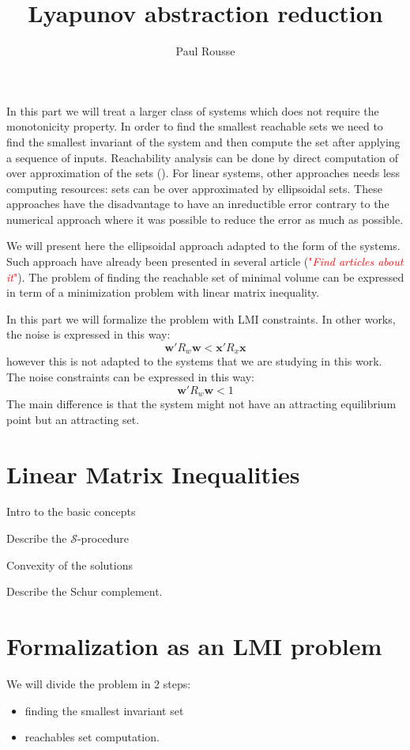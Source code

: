 \documentclass{article}
\theoremstyle{named}
\newcommand{\vect}[1]{\ensuremath{ \mathbf{#1}}}
\newcommand\comment[1]{\textcolor{red}{"\textit{#1}"}}
\newcommand{\Sproc}{$\mathcal{S}$-procedure}
\begin{document}
\title{Lyapunov abstraction reduction}
\author{Paul Rousse}

\maketitle

In this part we will treat a larger class of systems which does not require the monotonicity property.
In order to find the smallest reachable sets we need to find the smallest invariant of the system and then compute the set after applying a sequence of inputs.
Reachability analysis can be done by direct computation of over approximation of the sets (\cite{reissig2011computing}). For linear systems, other approaches needs less computing resources: sets can be over approximated by ellipsoidal sets. These approaches have the disadvantage to have an inreductible error contrary to the numerical approach where it was possible to reduce the error as much as possible.

We will present here the ellipsoidal approach adapted to the form of the systems.
Such approach have already been presented in several article (\comment{Find articles about it}).
The problem of finding the reachable set of minimal volume can be expressed in term of a minimization problem with linear matrix inequality.

In this part we will formalize the problem with LMI constraints.
In other works, the noise is expressed in this way:
$$
\vect{w}' R_w \vect{w} < \vect{x}' R_x \vect{x}
$$
however this is not adapted to the systems that we are studying in this work.
The noise constraints can be expressed in this way:
$$
\vect{w}' R_w \vect{w} < 1
$$
The main difference is that the system might not have an attracting equilibrium point but an attracting set.

\section{Linear Matrix Inequalities}
Intro to the basic concepts

Describe the \Sproc{} 

Convexity of the solutions

Describe the Schur complement.

\section{Formalization as an LMI problem}
We will divide the problem in 2 steps:
\begin{itemize}
\item finding the smallest invariant set
\item reachables set computation.
\end{itemize}
\end{document}
